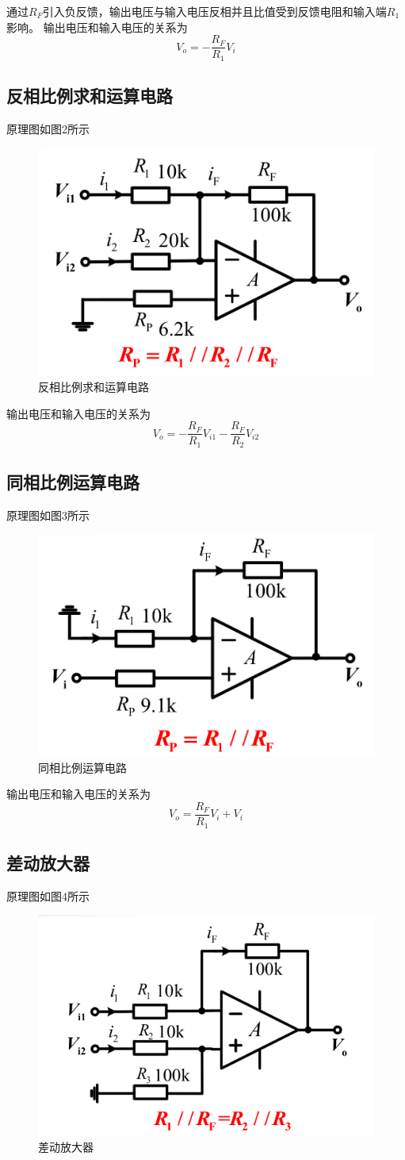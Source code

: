 \documentclass[UTF8]{article}
\begin{document}
    通过$R_F$引入负反馈，输出电压与输入电压反相并且比值受到反馈电阻和输入端$R_1$影响。
    输出电压和输入电压的关系为
    $$
    V_o=-\frac{R_F}{R_1} V_i
    $$

    \subsection{反相比例求和运算电路}
    原理图如图2所示

    \begin{figure}[htbp]
		\centering
        \includegraphics[width=0.5\linewidth]{sbbb2}
        \caption{反相比例求和运算电路}
	\end{figure}

    输出电压和输入电压的关系为
    $$
    V_o=-\frac{R_F}{R_1} V_{i1}-\frac{R_F}{R_2} V_{i2}
    $$

    \subsection{同相比例运算电路}
    原理图如图3所示

    \begin{figure}[htbp]
		\centering
        \includegraphics[width=0.5\linewidth]{sbbb3}
        \caption{同相比例运算电路}
	\end{figure}

    输出电压和输入电压的关系为
    $$
    V_o=\frac{R_F}{R_1} V_{i}+V_i
    $$

    \subsection{差动放大器}
    原理图如图4所示
    \begin{figure}[htbp]
		\centering
        \includegraphics[width=0.5\linewidth]{sbbb4}
        \caption{差动放大器}
	\end{figure}
\end{document}

